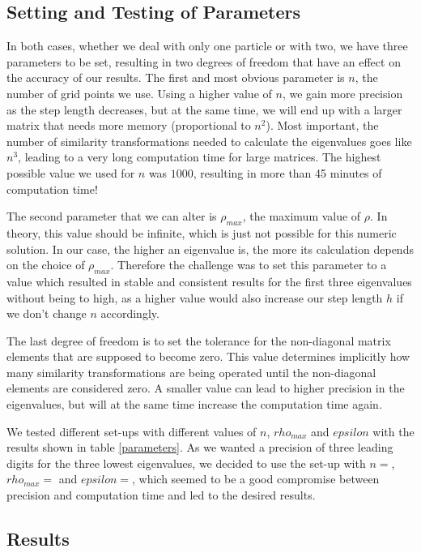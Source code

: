 \documentclass[10pt,a4paper]{article}
\begin{document}
\subsection{Setting and Testing of Parameters}
In both cases, whether we deal with only one particle or with two, we have three parameters to be set, resulting in two degrees of freedom that have an effect on the accuracy of our results. The first and most obvious parameter is $n$, the number of grid points we use. Using a higher value of $n$, we gain more precision as the step length decreases, but at the same time, we will end up with a larger matrix that needs more memory (proportional to $n^2$). Most important, the number of similarity transformations needed to calculate the eigenvalues goes like $n^3$, leading to a very long computation time for large matrices. The highest possible value we used for $n$ was $1000$, resulting in more than 45 minutes of computation time!

The second parameter that we can alter is $\rho_{max}$, the maximum value of $\rho$. In theory, this value should be infinite, which is just not possible for this numeric solution. In our case, the higher an eigenvalue is, the more its calculation depends on the choice of $\rho_{max}$. Therefore the challenge was to set this parameter to a value which resulted in stable and consistent results for the first three eigenvalues without being to high, as a higher value would also increase our step length $h$ if we don't change $n$ accordingly.

The last degree of freedom is to set the tolerance for the non-diagonal matrix elements that are supposed to become zero. This value determines implicitly how many similarity transformations are being operated until the non-diagonal elements are considered zero. A smaller value can lead to higher precision in the eigenvalues, but will at the same time increase the computation time again.

We tested different set-ups with different values of $n$, $rho_{max}$ and $epsilon$ with the results shown in table \ref{parameters}. As we wanted a precision of three leading digits for the three lowest eigenvalues, we decided to use the set-up with $n=$, $rho_{max}=$ and $epsilon=$, which seemed to be a good compromise between precision and computation time and led to the desired results.
\subsection{Results}
\end{document}

